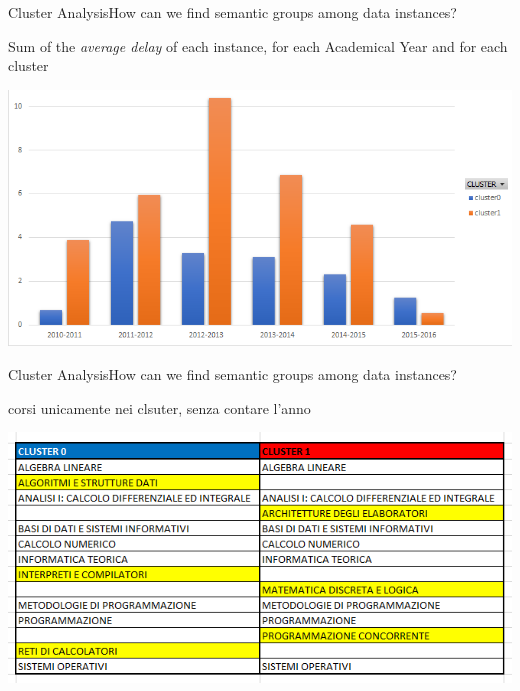 \begin{frame}{Cluster Analysis}{How can we find semantic groups among data instances?}

    Sum of the \emph{average delay} of each instance, for each Academical Year and for each cluster

    \begin{centering}
        \hspace{0.5cm}\includegraphics[scale=0.40]{cluster4.png}
    \end{centering}

\end{frame}

\begin{frame}{Cluster Analysis}{How can we find semantic groups among data instances?}

    corsi unicamente nei clsuter, senza contare l'anno

    \begin{centering}
        \hspace{0.5cm}\includegraphics[scale=0.40]{../cluster/min_kmeans_2cl_corsi_cluster.png}
    \end{centering}

\end{frame}